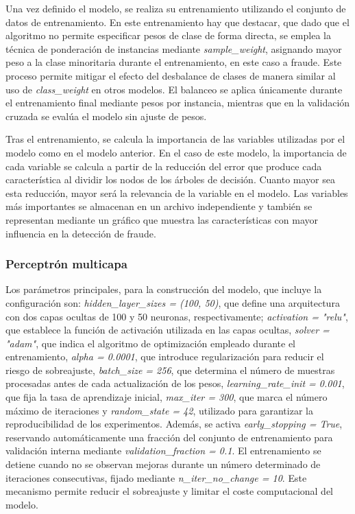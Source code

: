 \documentclass[12pt,a4paper]{report}
\begin{document}
Una vez definido el modelo, se realiza su entrenamiento utilizando el conjunto de datos de entrenamiento. En este entrenamiento hay que destacar, que dado que el algoritmo no permite especificar pesos de clase de forma directa, se emplea la técnica de ponderación de instancias mediante \emph{sample\_weight}, asignando mayor peso a la clase minoritaria durante el entrenamiento, en este caso a fraude.  Este proceso permite mitigar el efecto del desbalance de clases de manera similar al uso de \emph{class\_weight} en otros modelos. El balanceo se aplica únicamente durante el entrenamiento final mediante pesos por instancia, mientras que en la validación cruzada se evalúa el modelo sin ajuste de pesos.

Tras el entrenamiento, se calcula la importancia de las variables utilizadas por el modelo como en el modelo anterior. En el caso de este modelo, la importancia de cada variable se calcula a partir de la reducción del error que produce cada característica al dividir los nodos de los árboles de decisión. Cuanto mayor sea esta reducción, mayor será la relevancia de la variable en el modelo. Las variables más importantes se almacenan en un archivo independiente y también se representan mediante un gráfico que muestra las características con mayor influencia en la detección de fraude.


\subsubsection{Perceptrón multicapa}

Los parámetros principales, para la construcción del modelo, que incluye la configuración son: \emph{hidden\_layer\_sizes = (100, 50)}, que define una arquitectura con dos capas ocultas de 100 y 50 neuronas, respectivamente; \emph{activation = "relu"}, que establece la función de activación utilizada en las capas ocultas, \emph{solver = "adam"}, que indica el algoritmo de optimización empleado durante el entrenamiento, \emph{alpha = 0.0001}, que introduce regularización para reducir el riesgo de sobreajuste, \emph{batch\_size = 256}, que determina el número de muestras procesadas antes de cada actualización de los pesos, \emph{learning\_rate\_init = 0.001}, que fija la tasa de aprendizaje inicial, \emph{max\_iter = 300}, que marca el número máximo de iteraciones y \emph{random\_state = 42}, utilizado para garantizar la reproducibilidad de los experimentos. Además, se activa \emph{early\_stopping = True}, reservando automáticamente una fracción del conjunto de entrenamiento para validación interna mediante \emph{validation\_fraction = 0.1}. El entrenamiento se detiene cuando no se observan mejoras durante un número determinado de iteraciones consecutivas, fijado mediante \emph{n\_iter\_no\_change = 10}. Este mecanismo permite reducir el sobreajuste y limitar el coste computacional del modelo.
\end{document}
